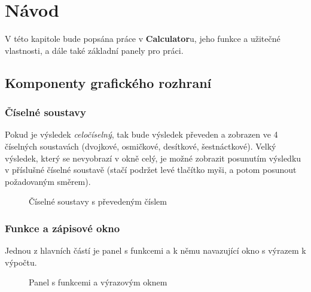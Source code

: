 \documentclass[a4paper, 11pt]{article}
\begin{document}
\section{Návod}

V této kapitole bude popsána práce v \textbf{Calculator}u, jeho funkce a užitečné
vlastnosti, a dále také základní panely pro práci.

\subsection{Komponenty grafického rozhraní}

\subsubsection{Číselné soustavy}

Pokud je výsledek \emph{celočíselný}, tak bude výsledek převeden a
zobrazen ve 4 číselných soustavách (dvojkové, osmičkové, desítkové,
šestnáctkové). Velký výsledek, který se nevyobrazí v okně celý, je možné
zobrazit posunutím výsledku v příslušné číselné soustavě (stačí podržet levé tlačítko myši, a potom posunout požadovaným směrem).

\begin{figure}[H]
    \centering
    \caption{Číselné soustavy s převedeným číslem}
\end{figure}


\subsubsection{Funkce a zápisové okno}

Jednou z hlavních částí je panel s funkcemi a k němu navazující okno s
výrazem k výpočtu.

\begin{figure}[H]
    \centering
    \caption{Panel s funkcemi a výrazovým oknem}
\end{figure}
\end{document}
